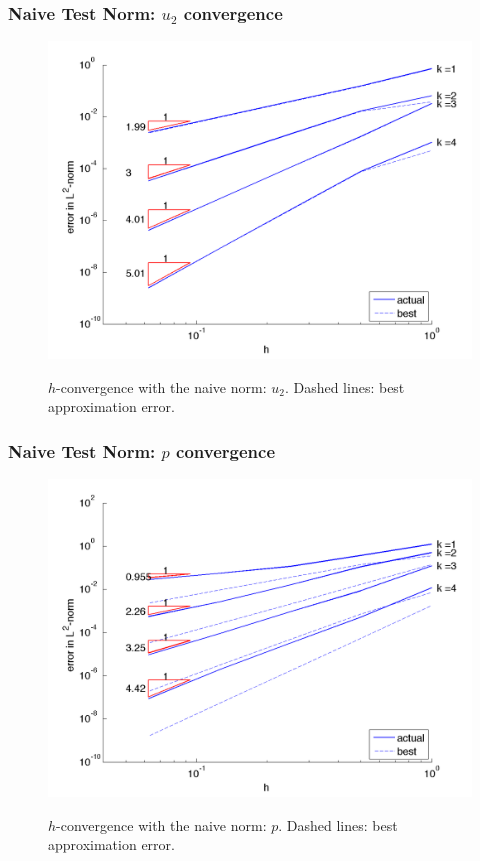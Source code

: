 \documentclass[mathserif]{beamer}
\begin{document}
\addtocounter{framenumber}{-1} %
\begin{frame}
\frametitle{Naive Test Norm: $u_{2}$ convergence}
\begin{figure}[!htb]
\center
{\setlength{\fboxsep}{1pt}\colorbox{pecos2}{\includegraphics[scale=.38]{../figures/u2_naive_h.png}}}
\caption{$h$-convergence with the naive norm: $u_{2}$.  Dashed lines: best approximation error.}
\end{figure}
\end{frame}

\addtocounter{framenumber}{-1} %
\begin{frame}
\frametitle{Naive Test Norm: $p$ convergence}
\begin{figure}[!htb]
\center
{\setlength{\fboxsep}{1pt}\colorbox{pecos2}{\includegraphics[scale=.38]{../figures/pressure_naive_h.png}}}
\caption{$h$-convergence with the naive norm: $p$.  Dashed lines: best approximation error.}
\end{figure}
\end{frame}
\end{document}
